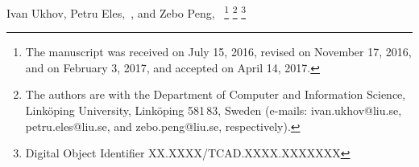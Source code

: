 Ivan Ukhov,
Petru Eles,~, and
Zebo Peng,~
\vspace{-2.5em}
\thanks{
  The manuscript was received on July 15, 2016, revised on November 17, 2016,
  and on February 3, 2017, and accepted on April 14, 2017.
}%
\thanks{
  The authors are with the Department of Computer and Information Science,
  Link\"{o}ping University, Link\"{o}ping 581\,83, Sweden (e-mails:
  ivan.ukhov@liu.se, petru.eles@liu.se, and zebo.peng@liu.se, respectively).
}%
\thanks{
  Digital Object Identifier XX.XXXX/TCAD.XXXX.XXXXXXX
}%
